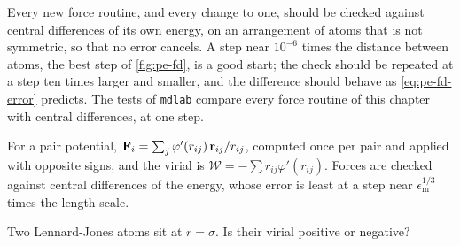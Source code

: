 \begin{practice}
Every new force routine, and every change to one, should be checked
against central differences of its own energy, on an arrangement of atoms
that is not symmetric, so that no error cancels. A step near
$10^{-6}$ times the distance between atoms, the best step of
\cref{fig:pe-fd}, is a good start; the check should be repeated at a step
ten times larger and smaller, and the difference should behave as
\cref{eq:pe-fd-error} predicts. The tests of \texttt{mdlab} compare every
force routine of this chapter with central differences, at one step.
\end{practice}

\begin{keyidea}
For a pair potential, $\bm{\mathrm{F}}_i = \sum_j\varphi'(r_{ij})\,\bm{\mathrm{r}}_{ij}/
r_{ij}$, computed once per pair and applied with opposite signs, and the
virial is $\mathcal{W} = -\sum r_{ij}\varphi'(r_{ij})$. Forces are checked against
central differences of the energy, whose error is least at a step near
$\epsilon_{\mathrm m}^{1/3}$ times the length scale.
\end{keyidea}


\begin{selfcheck}
Two Lennard-Jones atoms sit at $r = \sigma$. Is their virial positive or
negative?
\end{selfcheck}
